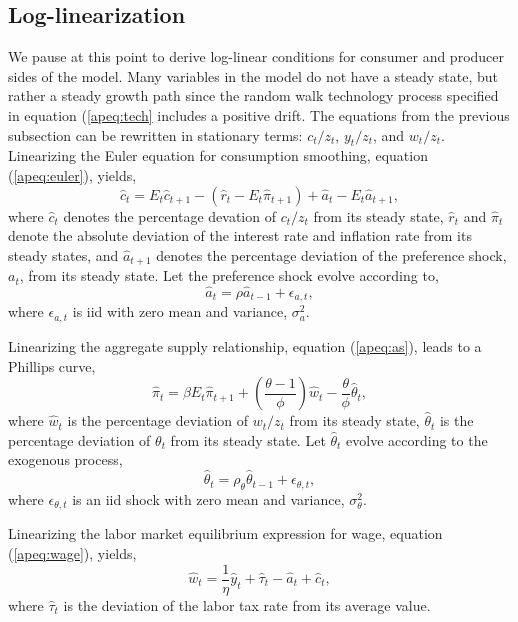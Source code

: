 \documentclass[12pt]{article}
\newcommand{\beq}{\begin{equation}}
\newcommand{\eeq}{\end{equation}}
\begin{document}
\subsection{Log-linearization}
We pause at this point to derive log-linear conditions for consumer and producer sides of the model.  Many variables in the model do not have a steady state, but rather a steady growth path since the random walk technology process specified in equation (\ref{apeq:tech} includes a positive drift.  The equations from the previous subsection can be rewritten in stationary terms: $c_t/z_t$, $y_t/z_t$, and $w_t/z_t$.  Linearizing the Euler equation for consumption smoothing, equation (\ref{apeq:euler}), yields,
\beq \label{apeq:is} \hat{c}_t = E_t \hat{c}_{t+1} - (\hat{r}_t - E_t \hat{\pi}_{t+1}) + \hat{a}_t - E_t \hat{a}_{t+1}, \eeq
where $\hat{c}_t$ denotes the percentage devation of $c_t/z_t$ from its steady state, $\hat{r}_t$ and $\hat{\pi}_{t}$ denote the absolute deviation of the interest rate and inflation rate from its steady states, and $\hat{a}_{t+1}$ denotes the percentage deviation of the preference shock, $a_t$, from its steady state.  Let the preference shock evolve according to,
\beq \label{apeq:prefshock} \hat{a}_t = \rho \hat{a}_{t-1} + \epsilon_{a,t}, \eeq
where $\epsilon_{a,t}$ is iid with zero mean and variance, $\sigma_a^2$.

Linearizing the aggregate supply relationship, equation (\ref{apeq:as}), leads to a Phillips curve,
\beq \label{apeq:phillips} \hat{\pi}_t = \beta E_t \hat{\pi}_{t+1} + \left(\frac{\theta-1}{\phi}\right) \hat{w}_t - \frac{\theta}{\phi} \hat{\theta}_t, \eeq
where $\hat{w}_t$ is the percentage deviation of $w_t/z_t$ from its steady state, $\hat{\theta}_t$ is the percentage deviation of $\theta_t$ from its steady state.  Let $\hat{\theta}_t$ evolve according to the exogenous process,
\beq \label{eq:costshock} \hat{\theta}_t = \rho_\theta \hat{\theta}_{t-1} + \epsilon_{\theta,t}, \eeq
where $\epsilon_{\theta,t}$ is an iid shock with zero mean and variance, $\sigma^2_{\theta}$.

Linearizing the labor market equilibrium expression for wage, equation (\ref{apeq:wage}), yields,
\beq \label{apeq:lwage} \hat{w}_t = \frac{1}{\eta} \hat{y}_t + \hat{\tau}_t - \hat{a}_t + \hat{c}_t, \eeq
where $\hat{\tau}_t$ is the deviation of the labor tax rate from its average value.
\end{document}
